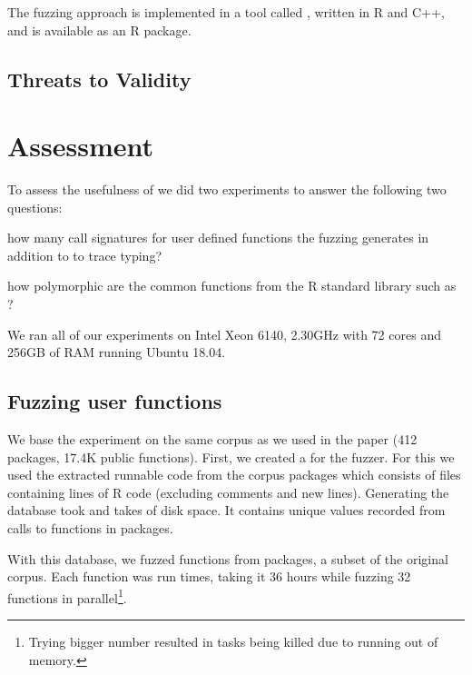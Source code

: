 \documentclass[sigplan,anonymous,review]{acmart}
\begin{document}
The fuzzing approach is implemented in a tool called \tool, written in R and C++, and is available as an R package.

\subsection{Threats to Validity}



\section{Assessment}
\label{sec:assessment}

To assess the usefulness of \tool we did two experiments to answer the following two questions:
\begin{inparaenum}[(1)]
    \item how many call signatures for user defined functions the fuzzing generates in addition to to trace typing?
    \item how polymorphic are the common functions from the R standard library such as \code{+,-,*,/}?
\end{inparaenum}
We ran all of our experiments on Intel Xeon 6140, 2.30GHz with 72 cores and 256GB of RAM running Ubuntu 18.04.

\subsection{Fuzzing user functions}

We base the experiment on the same corpus as we used in the \typer paper (412 packages, 17.4K public functions).
First, we created a \sxpdb for the fuzzer.
For this we used the extracted runnable code from the corpus packages which consists of \DBNumSourceFiles files containing \DBSourceLinesOfCodeRnd lines of R code (excluding comments and new lines).
Generating the database took  and takes \DBFileSize of disk space.
It contains \DBValuesRnd unique values recorded from \DBNumCallsRnd calls to \DBNumFunctionsRnd functions in \DBNumPackages packages.

With this database, we fuzzed \UFNumFunctions functions from \UFNumPackages packages, a subset of the original corpus.
Each function was run \UFTracingBudget times, taking it 36 hours while fuzzing 32 functions in parallel\footnote{Trying bigger number resulted in tasks being killed due to running out of memory.}.
\end{document}
